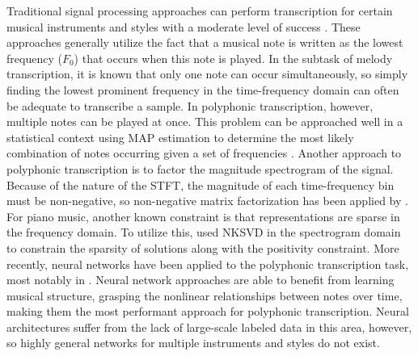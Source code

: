 Traditional signal processing approaches can perform transcription for certain musical instruments and styles with a moderate level of success \cite{klapuri_signal_2004} . These approaches generally utilize the fact that a musical note is written as the lowest frequency ($F_0$) that occurs when this note is played. In the subtask of melody transcription, it is known that only one note can occur simultaneously, so simply finding the lowest prominent frequency in the time-frequency domain can often be adequate to transcribe a sample. In polyphonic transcription, however, multiple notes can be played at once. This problem can be approached well in a statistical context using \ac{MAP} estimation to determine the most likely combination of notes occurring given a set of frequencies \cite{emiya_multipitch_2010}. Another approach to polyphonic transcription is to factor the magnitude spectrogram of the signal. Because of the nature of the \ac{STFT}, the magnitude of each time-frequency bin must be non-negative, so non-negative matrix factorization has been applied by \cite{smaragdis_non-negative_2003}. For piano music, another known constraint is that representations are sparse in the frequency domain. To utilize this, \cite{bertin_blind_2007} used \ac{NKSVD} in the spectrogram domain to constrain the sparsity of solutions along with the positivity constraint. More recently, neural networks have been applied to the polyphonic transcription task, most notably in \cite{hawthorne_onsets_2018}. Neural network approaches are able to benefit from learning musical structure, grasping the nonlinear relationships between notes over time, making them the most performant approach for polyphonic transcription. Neural architectures suffer from the lack of large-scale labeled data in this area, however, so highly general networks for multiple instruments and styles do not exist.
